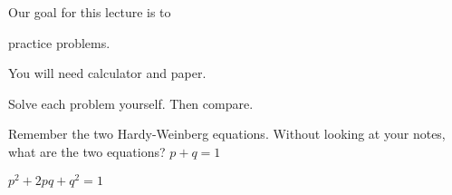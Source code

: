 \documentclass[t]{beamer}
\begin{document}
\begin{frame}{Our goal for this lecture is to}
	
	\hangpara practice  problems.

	\hangpara You will need calculator and paper.

	\hangpara Solve each problem yourself. Then compare.
\end{frame}
%

\begin{frame}{Remember the two Hardy-Weinberg equations.}
	Without looking at your notes, what are the two equations?\pause
	\hangpara\huge$p+q=1$\pause

	\normalsize\vspace{2ex}
\hangpara\huge$p^2+2pq+q^2=1$

\end{frame}
%
\end{document}
